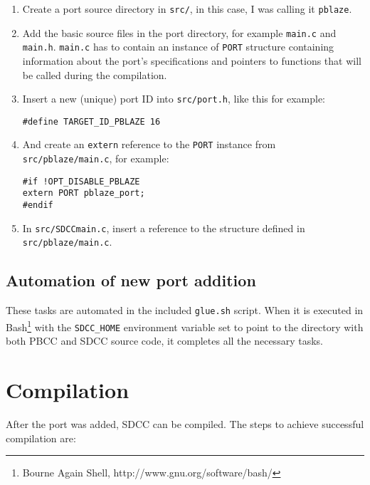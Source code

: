     \begin{enumerate}

    \item Create a port source directory in \texttt{src/}, in this case, I was calling it \texttt{pblaze}.

    \item Add the basic source files in the port directory, for example \texttt{main.c} and \texttt{main.h}. \texttt{main.c} has to contain an instance of \texttt{PORT} structure containing information about the port's specifications and pointers to functions that will be called during the compilation.

    \item Insert a new (unique) port ID into \texttt{src/port.h}, like this for example:

    \texttt{\#define TARGET\_ID\_PBLAZE    16}

    \item And create an \texttt{extern} reference to the \texttt{PORT} instance from \texttt{src/pblaze/main.c}, for example:

\begin{verbatim}#if !OPT_DISABLE_PBLAZE
extern PORT pblaze_port;
#endif\end{verbatim}

    \item In \texttt{src/SDCCmain.c}, insert a reference to the structure defined in \texttt{src/pblaze/main.c}.

    \end{enumerate}

        \subsection{Automation of new port addition}

        These tasks are automated in the included \texttt{glue.sh} script. When it is executed in  Bash\footnote{Bourne Again Shell, http://www.gnu.org/software/bash/} with the \texttt{SDCC\_HOME} environment variable set to point to the directory with both PBCC and SDCC source code, it completes all the necessary tasks.

    \section{Compilation}

    After the port was added, SDCC can be compiled. The steps to achieve successful compilation are:

